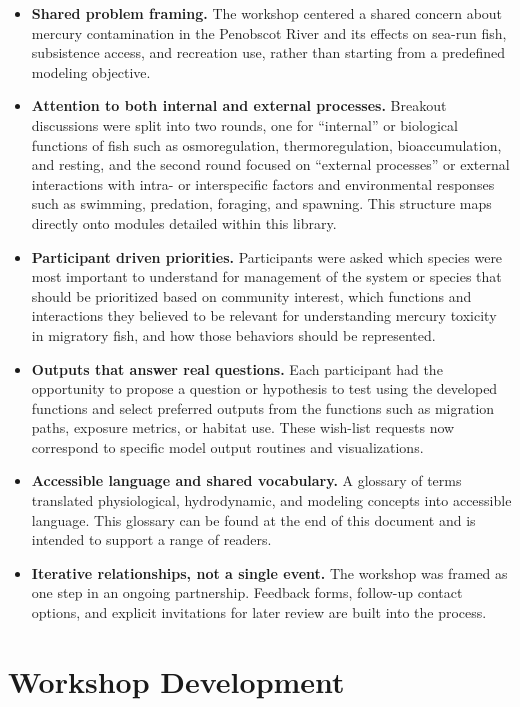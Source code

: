\documentclass[
]{book}
\begin{document}
\begin{itemize}
\item
  \textbf{Shared problem framing.} The workshop centered a shared concern about mercury contamination in the Penobscot River and its effects on sea-run fish, subsistence access, and recreation use, rather than starting from a predefined modeling objective.
\item
  \textbf{Attention to both internal and external processes.} Breakout discussions were split into two rounds, one for ``internal'' or biological functions of fish such as osmoregulation, thermoregulation, bioaccumulation, and resting, and the second round focused on ``external processes'' or external interactions with intra- or interspecific factors and environmental responses such as swimming, predation, foraging, and spawning. This structure maps directly onto modules detailed within this library.
\item
  \textbf{Participant driven priorities.} Participants were asked which species were most important to understand for management of the system or species that should be prioritized based on community interest, which functions and interactions they believed to be relevant for understanding mercury toxicity in migratory fish, and how those behaviors should be represented.
\item
  \textbf{Outputs that answer real questions.} Each participant had the opportunity to propose a question or hypothesis to test using the developed functions and select preferred outputs from the functions such as migration paths, exposure metrics, or habitat use. These wish-list requests now correspond to specific model output routines and visualizations.
\item
  \textbf{Accessible language and shared vocabulary.} A glossary of terms translated physiological, hydrodynamic, and modeling concepts into accessible language. This glossary can be found at the end of this document and is intended to support a range of readers.
\item
  \textbf{Iterative relationships, not a single event.} The workshop was framed as one step in an ongoing partnership. Feedback forms, follow-up contact options, and explicit invitations for later review are built into the process.
\end{itemize}

\section{Workshop Development}\label{workshop-development}
\end{document}

